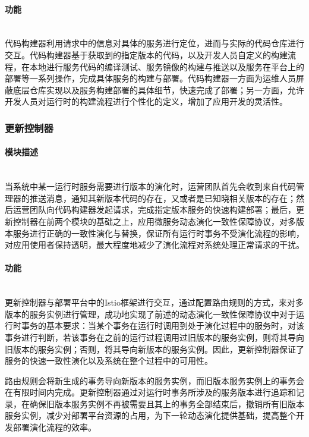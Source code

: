 \documentclass[a4paper]{article}
\theoremstyle{definition}
\begin{document}
\paragraph{功能}\mbox{}\\

代码构建器利用请求中的信息对具体的服务进行定位，进而与实际的代码仓库进行交互。代码构建器基于获取到的指定版本的代码，以及开发人员自定义的构建流程，在本地进行服务代码的编译测试、服务镜像的构建与推送以及服务在平台上的部署等一系列操作，完成具体服务的构建与部署。代码构建器一方面为运维人员屏蔽底层仓库实现以及服务构建部署的具体细节，快速完成了部署；另一方面，允许开发人员对运行时的构建流程进行个性化的定义，增加了应用开发的灵活性。

\subsubsection{更新控制器}
\paragraph{模块描述}\mbox{}\\

当系统中某一运行时服务需要进行版本的演化时，运营团队首先会收到来自代码管理器的推送消息，通知其新版本代码的存在，又或者是已知晓相关版本的存在；然后运营团队向代码构建器发起请求，完成指定版本服务的快速构建部署；最后，更新控制器在前两个模块的基础之上，应用微服务动态演化一致性保障协议，对多版本服务进行正确的一致性演化与替换，保证所有运行时事务不受演化流程的影响，对应用使用者保持透明，最大程度地减少了演化流程对系统处理正常请求的干扰。

\paragraph{功能}\mbox{}\\

更新控制器与部署平台中的Istio框架进行交互，通过配置路由规则的方式，来对多版本的服务实例进行管理，成功地实现了前述的动态演化一致性保障协议中对于运行时事务的基本要求：当某个事务在运行时调用到处于演化过程中的服务时，对该事务进行判断，若该事务在之前的运行过程调用过旧版本的服务实例，则将其导向旧版本的服务实例；否则，将其导向新版本的服务实例。因此，更新控制器保证了服务的快速一致性演化以及系统在整个过程中的可用性。

路由规则会将新生成的事务导向新版本的服务实例，而旧版本服务实例上的事务会在有限时间内完成。更新控制器通过对运行时事务所涉及的服务版本进行追踪和记录，在确保旧版本服务实例不再被需要且其上的事务全部结束后，撤销所有旧版本服务实例，减少对部署平台资源的占用，为下一轮动态演化提供基础，提高整个开发部署演化流程的效率。
\end{document}
